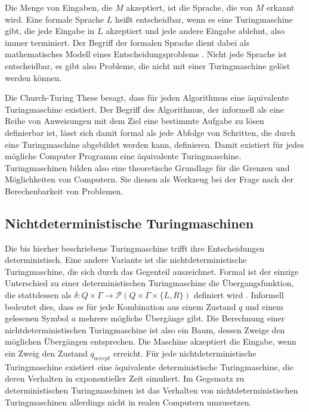 \documentclass[conference,compsoc,final,a4paper]{IEEEtran}
\begin{document}
Die Menge von Eingaben, die $M$ akzeptiert, ist die Sprache, die von $M$ erkannt wird. Eine formale Sprache $L$ heißt entscheidbar, wenn es eine Turingmaschine gibt, die jede Eingabe in $L$ akzeptiert und jede andere Eingabe ablehnt, also immer terminiert. Der Begriff der formalen Sprache dient dabei als mathematisches Modell eines Entscheidungsproblems \cite{handbook_theoretical_computer_science}. Nicht jede Sprache ist entscheidbar, es gibt also Probleme, die nicht mit einer Turingmaschine gelöst werden können. \cite{theory_of_computing}

Die Church-Turing These besagt, dass für jeden Algorithmus eine äquivalente Turingmaschine existiert.
Der Begriff des Algorithmus, der informell als eine Reihe von Anweisungen mit dem Ziel eine bestimmte Aufgabe zu lösen definierbar ist, lässt sich damit formal als jede Abfolge von Schritten, die durch eine Turingmaschine abgebildet werden kann, definieren. Damit existiert für jedes mögliche Computer Programm eine äquivalente Turingmaschine. Turingmaschinen bilden also eine theoretische Grundlage für die Grenzen und Möglichkeiten von Computern. Sie dienen als Werkzeug bei der Frage nach der Berechenbarkeit von Problemen. \cite{theory_of_computing} 

\subsection{Nichtdeterministische Turingmaschinen}
Die bis hierher beschriebene Turingmaschine trifft ihre Entscheidungen deterministisch. Eine andere Variante ist die nichtdeterministische Turingmaschine, die sich durch das Gegenteil auszeichnet. Formal ist der einzige Unterschied zu einer deterministischen Turingmaschine die Übergangsfunktion, die stattdessen als $\delta: Q \times \Gamma \longrightarrow \mathcal{P}(Q \times \Gamma \times \{L,R\})$ definiert wird \cite{theory_of_computing}. Informell bedeutet dies, dass es für jede Kombination aus einem Zustand $q$ und einem gelesenen Symbol $a$ mehrere mögliche Übergänge gibt. Die Berechnung einer nichtdeterministischen Turingmaschine ist also ein Baum, dessen Zweige den möglichen Übergängen entsprechen. Die Maschine akzeptiert die Eingabe, wenn ein Zweig den Zustand $q_{accept}$ erreicht. \cite{handbook_theoretical_computer_science}
Für jede nichtdeterministische Turingmaschine existiert eine äquivalente deterministische Turingmaschine, die deren Verhalten in exponentieller Zeit simuliert. Im Gegensatz zu deterministischen Turingmaschinen ist das Verhalten von nichtdeterministischen Turingmaschinen allerdings nicht in realen Computern umzusetzen. \cite{theory_of_computing}
\end{document}
